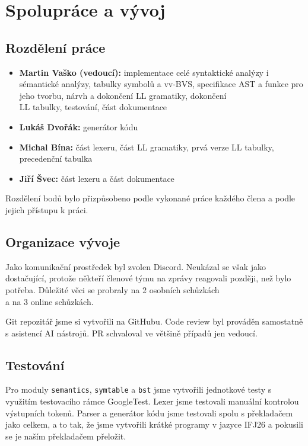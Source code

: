 \documentclass[10pt,a4paper]{article}
\begin{document}
\section{Spolupráce a vývoj}

\subsection{Rozdělení práce}

\begin{itemize}
    \item \textbf{Martin Vaško (vedoucí):} implementace celé syntaktické analýzy i 
    sémantické analýzy, tabulky symbolů a vv-BVS, specifikace AST a funkce pro jeho tvorbu,
    nárvh a dokončení LL gramatiky, dokončení \\ LL tabulky, testování, část dokumentace
    \item \textbf{Lukáš Dvořák:} generátor kódu 
    \item \textbf{Michal Bína:} část lexeru, část LL gramatiky,
     prvá verze LL tabulky, precedenční tabulka
    \item \textbf{Jiří Švec:} část lexeru a část dokumentace
\end{itemize}


Rozdělení bodů bylo přizpůsobeno podle vykonané práce každého člena a 
podle jejich přístupu k práci. 


\subsection{Organizace vývoje}
Jako komunikační prostředek byl zvolen Discord. Neukázal se však jako dostačující, 
protože někteří členové týmu na zprávy reagovali později, než bylo potřeba.
Důležité věci se probraly na 2 osobních schůzkách \\ a na 3 online schůzkách.

Git repozitář jsme si vytvořili na GitHubu. Code review byl prováděn samostatně
s asistencí AI nástrojů. PR schvaloval ve většině případů jen vedoucí.

\subsection{Testování}
Pro moduly \texttt{semantics}, \texttt{symtable} a \texttt{bst} jsme vytvořili
jednotkové testy s využitím testovacího rámce GoogleTest. Lexer jsme testovali
manuální kontrolou výstupních tokenů. Parser a generátor kódu jsme testovali spolu
s překladačem jako celkem, a to tak, že jsme vytvořili krátké programy v jazyce IFJ26 
a pokusili se je naším překladačem přeložit.
\end{document}
